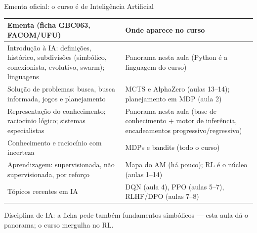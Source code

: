 \documentclass[aspectratio=169, 11pt]{beamer}
\begin{document}
\begin{frame}[shrink]{Ementa oficial: o curso é de Inteligência Artificial}
  \begin{center}
  \footnotesize
  \begin{tabular}{@{}p{7.6cm}p{5.2cm}@{}}
    \toprule
    \textbf{Ementa (ficha GBC063, FACOM/UFU)} & \textbf{Onde aparece no curso} \\
    \midrule
    Introdução à IA: definições, histórico, subdivisões (simbólico,
    conexionista, evolutivo, swarm); linguagens &
      Panorama nesta aula (Python é a linguagem do curso) \\
    Solução de problemas: busca, busca informada, jogos e planejamento &
      MCTS e AlphaZero (aulas 13–14); planejamento em MDP (aula 2) \\
    Representação do conhecimento; raciocínio lógico; sistemas
    especialistas &
      Panorama nesta aula (base de conhecimento + motor de inferência,
      encadeamentos progressivo/regressivo) \\
    Conhecimento e raciocínio com incerteza &
      MDPs e bandits (todo o curso) \\
    Aprendizagem: supervisionada, não supervisionada, por reforço &
      Mapa do AM (há pouco); RL é o núcleo (aulas 1–14) \\
    Tópicos recentes em IA &
      DQN (aula 4), PPO (aulas 5–7), RLHF/DPO (aulas 7–8) \\
    \bottomrule
  \end{tabular}
  \end{center}

  \begin{alertabox}
    Disciplina de IA: a ficha pede também fundamentos simbólicos — esta aula dá o panorama; o curso mergulha no RL.
  \end{alertabox}
\end{frame}
\end{document}
